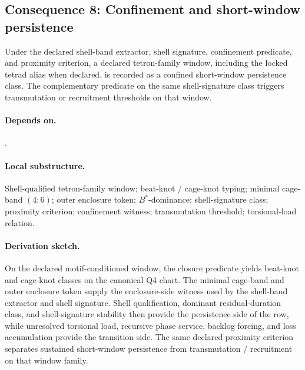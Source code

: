 \subsection{Consequence 8: Confinement and short-window persistence}
\begin{consequence}\label{cons:c8}
Under the declared shell-band extractor, shell signature, confinement predicate, and proximity criterion, a declared tetron-family window, including the locked tetrad alias when declared, is recorded as a confined short-window persistence class. The complementary predicate on the same shell-signature class triggers transmutation or recruitment thresholds on that window.
\end{consequence}
\paragraph{Depends on.} .
\paragraph{Local substructure.} Shell-qualified tetron-family window; beat-knot / cage-knot typing; minimal cage-band $(4{:}6)$; outer enclosure token; $B^*$-dominance; shell-signature class; proximity criterion; confinement witness; transmutation threshold; torsional-load relation.
\paragraph{Derivation sketch.} On the declared motif-conditioned window, the closure predicate yields beat-knot and cage-knot classes on the canonical Q4 chart. The minimal cage-band and outer enclosure token supply the enclosure-side witness used by the shell-band extractor and shell signature. Shell qualification, dominant residual-duration class, and shell-signature stability then provide the persistence side of the row, while unresolved torsional load, recursive phase service, backlog forcing, and loss accumulation provide the transition side. The same declared proximity criterion separates sustained short-window persistence from transmutation / recruitment on that window family.
